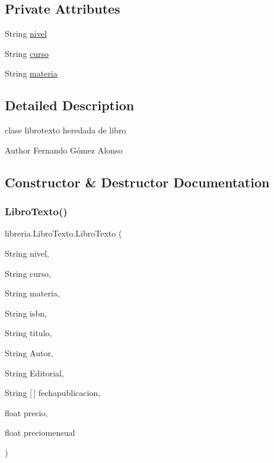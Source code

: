 \subsection*{Private Attributes}
\begin{DoxyCompactItemize}
\item 
String \mbox{\hyperlink{classlibreria_1_1_libro_texto_a176cfd7d4cd77048392188fa39a444b9}{nivel}}
\item 
String \mbox{\hyperlink{classlibreria_1_1_libro_texto_a8ca1aa8329b1cc51b986d7826c25ee10}{curso}}
\item 
String \mbox{\hyperlink{classlibreria_1_1_libro_texto_aed34f3bc7feec9962c4877156fb6ae0c}{materia}}
\end{DoxyCompactItemize}


\subsection{Detailed Description}
clase librotexto heredada de libro \begin{DoxyAuthor}{Author}
Fernando Gómez Alonso 
\end{DoxyAuthor}


\subsection{Constructor \& Destructor Documentation}
\mbox{\label{classlibreria_1_1_libro_texto_a71848367cd42018a168acdf0a9fa0764}} 
\subsubsection{\texorpdfstring{Libro\+Texto()}{LibroTexto()}}
{\footnotesize\ttfamily libreria.\+Libro\+Texto.\+Libro\+Texto (\begin{DoxyParamCaption}\item[{String}]{nivel,  }\item[{String}]{curso,  }\item[{String}]{materia,  }\item[{String}]{isbn,  }\item[{String}]{titulo,  }\item[{String}]{Autor,  }\item[{String}]{Editorial,  }\item[{String \mbox{[}$\,$\mbox{]}}]{fechapublicacion,  }\item[{float}]{precio,  }\item[{float}]{preciomensual }\end{DoxyParamCaption})\hspace{0.3cm}{\ttfamily [inline]}}

